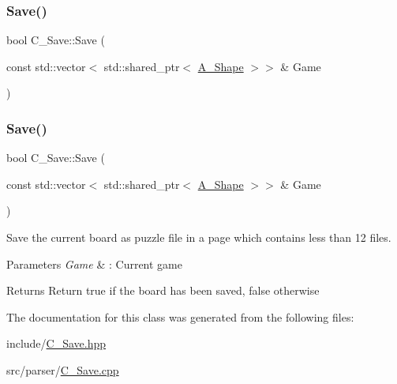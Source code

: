 \subsubsection{\texorpdfstring{Save()}{Save()}\hspace{0.1cm}{\footnotesize\ttfamily [1/2]}}
{\footnotesize\ttfamily bool C\+\_\+\+Save\+::\+Save (\begin{DoxyParamCaption}\item[{const std\+::vector$<$ std\+::shared\+\_\+ptr$<$ \hyperlink{classA__Shape}{A\+\_\+\+Shape} $>$$>$ \&}]{Game }\end{DoxyParamCaption})}

\mbox{\label{classC__Save_a144be848679b771afb9cf410710308e8}} 
\subsubsection{\texorpdfstring{Save()}{Save()}\hspace{0.1cm}{\footnotesize\ttfamily [2/2]}}
{\footnotesize\ttfamily bool C\+\_\+\+Save\+::\+Save (\begin{DoxyParamCaption}\item[{const std\+::vector$<$ std\+::shared\+\_\+ptr$<$ \hyperlink{classA__Shape}{A\+\_\+\+Shape} $>$$>$ \&}]{Game }\end{DoxyParamCaption})}



Save the current board as puzzle file in a page which contains less than 12 files. 


\begin{DoxyParams}{Parameters}
{\em Game} & \+: Current game \\
\hline
\end{DoxyParams}
\begin{DoxyReturn}{Returns}
Return true if the board has been saved, false otherwise 
\end{DoxyReturn}


The documentation for this class was generated from the following files\+:\begin{DoxyCompactItemize}
\item 
include/\hyperlink{C__Save_8hpp}{C\+\_\+\+Save.\+hpp}\item 
src/parser/\hyperlink{C__Save_8cpp}{C\+\_\+\+Save.\+cpp}\end{DoxyCompactItemize}
